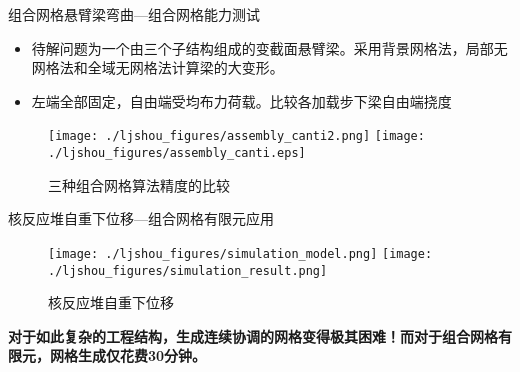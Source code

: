 \documentclass[mathserif]{beamer}
\begin{document}
\begin{CJK}{UTF8}{gkai}
\begin{frame}{组合网格悬臂梁弯曲—组合网格能力测试}
    \begin{itemize}
    \item 待解问题为一个由三个子结构组成的变截面悬臂梁。采用背景网格法，局部无网格法和全域无网格法计算梁的大变形。
    \item 左端全部固定，自由端受均布力荷载。比较各加载步下梁自由端挠度
    \end{itemize}
	\begin{figure}
		\centering
		\texttt{[image: ./ljshou\_figures/assembly\_canti2.png]}
		\texttt{[image: ./ljshou\_figures/assembly\_canti.eps]}
		\caption{三种组合网格算法精度的比较}
	\end{figure}
\end{frame}



\begin{frame}{核反应堆自重下位移—组合网格有限元应用}
    \begin{figure}
    \centering
    \texttt{[image: ./ljshou\_figures/simulation\_model.png]}
    \texttt{[image: ./ljshou\_figures/simulation\_result.png]}
    \caption{核反应堆自重下位移}
    \end{figure}
	\begin{block}{}
		\color{red}\bf 对于如此复杂的工程结构，生成连续协调的网格变得极其困难！而对于组合网格有限元，网格生成仅花费30分钟。
	\end{block}
\end{frame}



\end{CJK}
\end{document}
